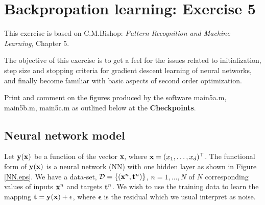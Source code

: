 \documentclass[12pt]{article}
\def\y{{\bf y}}
\def\x{{\bf x}}
\def\t{{\bf t}}
\def\D{\mathcal{D}}
\begin{document}
\section*{Backpropation learning: Exercise 5}
This exercise is based on C.M.Bishop: \emph{Pattern Recognition
and Machine Learning}, Chapter 5.

The objective of this exercise is to get a feel for the issues
related to initialization, step size and stopping criteria for
gradient descent learning of neural networks, and finally become
familiar with basic aspects of second order optimization.

Print and comment on the figures produced by the software {\sf
 main5a.m, main5b.m, main5c.m} as outlined below at the {\bf
 Checkpoints}.

\subsection*{Neural network model}


Let $\y(\x)$ be a function of the vector \x, where
$\x=(x_1,\ldots,x_d)^\top$. The functional form of $\y(\x)$ is
 a neural network (NN) with one hidden layer as shown in Figure \ref{NN.eps}. We have a data-set, $\D = \left\{ (\x^n,\t^n)
\right\}$, $ n=1,\ldots,N$ of $N$ corresponding values of inputs $\x^n$ and
targets $\t^n$. We wish to use the training data to learn the mapping $\t=\y(\x)+\mathbf{\epsilon}$, where $\mathbf{\epsilon}$ is the residual which we usual interpret as noise.
\end{document}
